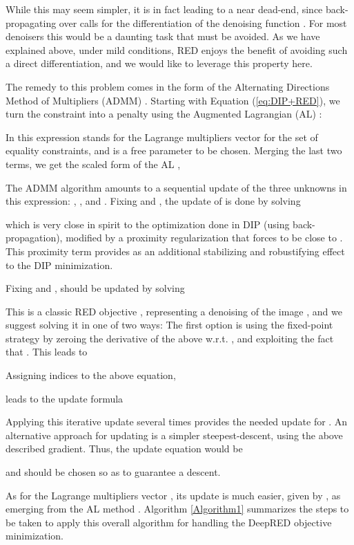 \documentclass[12pt]{article}
\begin{document}
While this may seem simpler, it is in fact leading to a near dead-end, since back-propagating over  calls for the differentiation of the denoising function . For most denoisers this would be a daunting task that must be avoided. As we have explained above, under mild conditions, RED enjoys the benefit of avoiding such a direct differentiation, and we would like to leverage this property here. 

The remedy to this problem comes in the form of the Alternating Directions Method of Multipliers (ADMM) \cite{ADMM}. Starting with Equation (\ref{eq:DIP+RED}), we turn the constraint into a penalty using the Augmented Lagrangian (AL) \cite{AL}: 

In this expression  stands for the Lagrange multipliers vector for the set of equality constraints, and  is a free parameter to be chosen. Merging the last two terms, we get the scaled form of the AL \cite{AL}, 

The ADMM algorithm amounts to a sequential update of the three unknowns in this expression:  , , and . Fixing  and , the update of  is done by solving 

which is very close in spirit to the optimization done in DIP (using back-propagation), modified by a proximity regularization that forces  to be close to . This proximity term provides as an additional stabilizing and robustifying effect to the DIP minimization. 

Fixing  and ,  should be updated by solving 

This is a classic RED objective \cite{RED-2017}, representing a denoising of the image , and we suggest solving it in one of two ways: The first option is using the fixed-point strategy by zeroing the derivative of the above w.r.t. , and exploiting the fact that . This leads to 

Assigning indices to the above equation, 

leads to the update formula

Applying this iterative update several times provides the needed update for . 
An alternative approach for updating  is a simpler steepest-descent, using the above described gradient. Thus, the update equation would be 

and  should be chosen so as to guarantee a descent. 

As for the Lagrange multipliers vector , its update is much easier, given by , as emerging from the AL method \cite{ADMM, AL}. Algorithm \ref{Algorithm1} summarizes the steps to be taken to apply this overall algorithm for handling the DeepRED objective minimization. 
\end{document}
